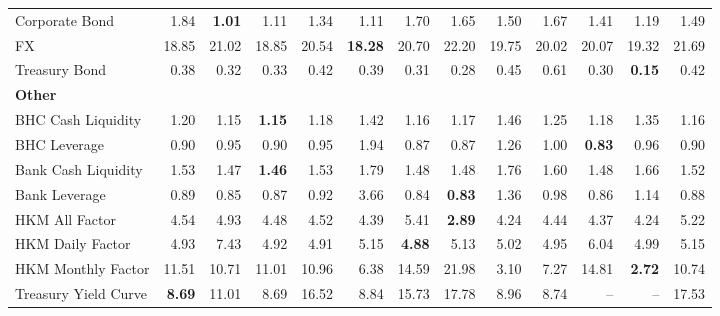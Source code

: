 \begin{table}[htbp]
\begin{tabular}{@{}lrrrrrrrrrrrr@{}}
Corporate Bond & 1.84 & \textbf{1.01} & 1.11 & 1.34 & 1.11 & 1.70 & 1.65 & 1.50 & 1.67 & 1.41 & 1.19 & 1.49 \\
FX & 18.85 & 21.02 & 18.85 & 20.54 & \textbf{18.28} & 20.70 & 22.20 & 19.75 & 20.02 & 20.07 & 19.32 & 21.69 \\
Treasury Bond & 0.38 & 0.32 & 0.33 & 0.42 & 0.39 & 0.31 & 0.28 & 0.45 & 0.61 & 0.30 & \textbf{0.15} & 0.42 \\
\midrule
\multicolumn{13}{l}{\textbf{Other}} \\
BHC Cash Liquidity & 1.20 & 1.15 & \textbf{1.15} & 1.18 & 1.42 & 1.16 & 1.17 & 1.46 & 1.25 & 1.18 & 1.35 & 1.16 \\
BHC Leverage & 0.90 & 0.95 & 0.90 & 0.95 & 1.94 & 0.87 & 0.87 & 1.26 & 1.00 & \textbf{0.83} & 0.96 & 0.90 \\
Bank Cash Liquidity & 1.53 & 1.47 & \textbf{1.46} & 1.53 & 1.79 & 1.48 & 1.48 & 1.76 & 1.60 & 1.48 & 1.66 & 1.52 \\
Bank Leverage & 0.89 & 0.85 & 0.87 & 0.92 & 3.66 & 0.84 & \textbf{0.83} & 1.36 & 0.98 & 0.86 & 1.14 & 0.88 \\
HKM All Factor & 4.54 & 4.93 & 4.48 & 4.52 & 4.39 & 5.41 & \textbf{2.89} & 4.24 & 4.44 & 4.37 & 4.24 & 5.22 \\
HKM Daily Factor & 4.93 & 7.43 & 4.92 & 4.91 & 5.15 & \textbf{4.88} & 5.13 & 5.02 & 4.95 & 6.04 & 4.99 & 5.15 \\
HKM Monthly Factor & 11.51 & 10.71 & 11.01 & 10.96 & 6.38 & 14.59 & 21.98 & 3.10 & 7.27 & 14.81 & \textbf{2.72} & 10.74 \\
Treasury Yield Curve & \textbf{8.69} & 11.01 & 8.69 & 16.52 & 8.84 & 15.73 & 17.78 & 8.96 & 8.74 & -- & -- & 17.53 \\
\bottomrule
\end{tabular}
\vspace{0.1cm}

\end{table}
